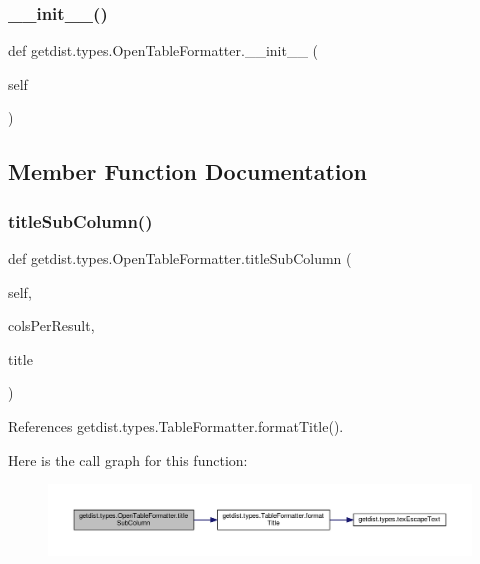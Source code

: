 \subsubsection{\texorpdfstring{\+\_\+\+\_\+init\+\_\+\+\_\+()}{\_\_init\_\_()}}
{\footnotesize\ttfamily def getdist.\+types.\+Open\+Table\+Formatter.\+\_\+\+\_\+init\+\_\+\+\_\+ (\begin{DoxyParamCaption}\item[{}]{self }\end{DoxyParamCaption})}



\subsection{Member Function Documentation}
\mbox{\label{classgetdist_1_1types_1_1OpenTableFormatter_a3623044047dc10b0038a8d50016816f6}} 
\subsubsection{\texorpdfstring{title\+Sub\+Column()}{titleSubColumn()}}
{\footnotesize\ttfamily def getdist.\+types.\+Open\+Table\+Formatter.\+title\+Sub\+Column (\begin{DoxyParamCaption}\item[{}]{self,  }\item[{}]{cols\+Per\+Result,  }\item[{}]{title }\end{DoxyParamCaption})}



References getdist.\+types.\+Table\+Formatter.\+format\+Title().

Here is the call graph for this function\+:
\nopagebreak
\begin{figure}[H]
\begin{center}
\leavevmode
\includegraphics[width=350pt]{classgetdist_1_1types_1_1OpenTableFormatter_a3623044047dc10b0038a8d50016816f6_cgraph}
\end{center}
\end{figure}


